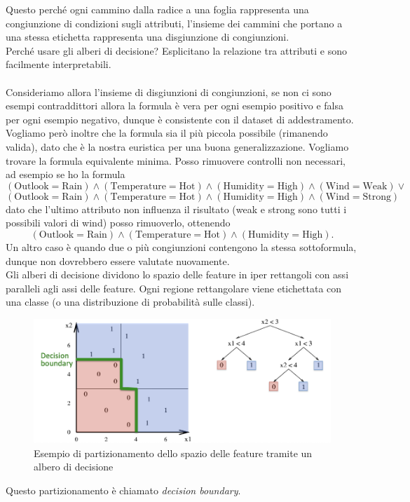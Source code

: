 Questo perché ogni cammino dalla radice a una foglia rappresenta una congiunzione di condizioni sugli attributi, l'insieme dei cammini che portano a una stessa etichetta rappresenta una disgiunzione di congiunzioni.
\\
Perché usare gli alberi di decisione?
Esplicitano la relazione tra attributi e sono facilmente interpretabili.
\\ \\
Consideriamo allora l'insieme di disgiunzioni di congiunzioni, se non ci sono esempi contraddittori allora la formula è vera per ogni esempio positivo e falsa per ogni esempio negativo,
dunque è consistente con il dataset di addestramento.
Vogliamo però inoltre che la formula sia il più piccola possibile (rimanendo valida), dato che è la nostra euristica per una buona generalizzazione.
Vogliamo trovare la formula equivalente minima.
Posso rimuovere controlli non necessari, ad esempio se ho la formula
\[
(\mathrm{Outlook}=\mathrm{Rain}) \land (\mathrm{Temperature}=\mathrm{Hot}) \land (\mathrm{Humidity}=\mathrm{High}) \land (\mathrm{Wind}=\mathrm{Weak}) \lor
\]
\[
(\mathrm{Outlook}=\mathrm{Rain}) \land (\mathrm{Temperature}=\mathrm{Hot}) \land (\mathrm{Humidity}=\mathrm{High}) \land (\mathrm{Wind}=\mathrm{Strong})
\]
dato che l'ultimo attributo non influenza il risultato (weak e strong sono tutti i possibili valori di wind) posso rimuoverlo, ottenendo
\[
(\mathrm{Outlook}=\mathrm{Rain}) \land (\mathrm{Temperature}=\mathrm{Hot}) \land (\mathrm{Humidity}=\mathrm{High}).
\]
Un altro caso è quando due o più congiunzioni contengono la stessa sottoformula, dunque non dovrebbero essere valutate nuovamente.
\\
Gli alberi di decisione dividono lo spazio delle feature in iper rettangoli con assi paralleli agli assi delle feature.
Ogni regione rettangolare viene etichettata con una classe (o una distribuzione di probabilità sulle classi).
\begin{figure}[h]
	\centering
	\includegraphics[width=\textwidth]{pictures/decisionBoundary.png}
	\caption{Esempio di partizionamento dello spazio delle feature tramite un albero di decisione}
\end{figure}
Questo partizionamento è chiamato \textit{decision boundary}.
